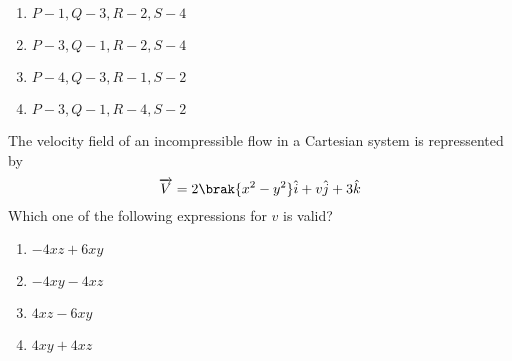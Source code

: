    \begin{enumerate}
        \item $P-1,Q-3,R-2,S-4$
        \item $P-3,Q-1,R-2,S-4$
        \item $P-4,Q-3,R-1,S-2$
        \item $P-3,Q-1,R-4,S-2$
    \end{enumerate}
    \item The velocity field of an incompressible flow in a Cartesian system is repressented by 
    $$\overrightarrow{V}=2\brak{x^2-y^2}\hat{i}+v\hat{j}+3\hat{k}$$
    Which one of the following expressions for $v$ is valid?
    \begin{enumerate}
        \item $-4xz+6xy$
        \item $-4xy-4xz$
        \item $4xz-6xy$
        \item $4xy+4xz$
    \end{enumerate}

